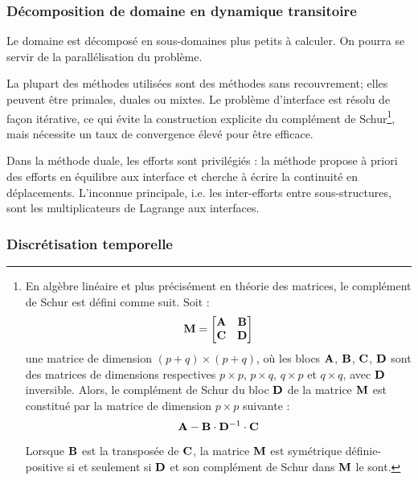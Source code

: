 \medskip
\subsubsection{Décomposition de domaine en dynamique transitoire}\label{Sec-Schur}

Le domaine est décomposé en sous-domaines plus petits à calculer.
On pourra se servir de la parallélisation du problème.

La plupart des méthodes utilisées sont des méthodes sans recouvrement; elles
peuvent être primales, duales ou mixtes. Le problème d'interface est résolu
de façon itérative, ce qui évite la construction explicite du complément
de Schur\footnote{%
En algèbre linéaire et plus précisément en théorie des matrices, le complément de
Schur est défini comme suit. Soit :
\begin{equation} \MM{M}=\MM*{\MM{A} & \MM{B} \\ \MM{C} & \MM{D}} \end{equation}
une matrice de dimension $(p+q)\times(p+q)$, où les blocs $\MM{A}$, $\MM{B}$, $\MM{C}$, $\MM{D}$ sont des matrices
de dimensions respectives $p\times p$, $p\times q$, $q\times p$ et $q\times q$, avec $\MM{D}$ inversible.
Alors, le complément de Schur du bloc $\MM{D}$ de la matrice $\MM{M}$ est constitué par la matrice
de dimension $p\times p$ suivante :
\begin{equation} \MM{A} - \MM{B}\cdot \MMI{D}\cdot \MM{C}\end{equation}

Lorsque $\MM{B}$ est la transposée de $\MM{C}$, la matrice $\MM{M}$ est symétrique définie-positive
si et seulement si $\MM{D}$ et son complément de Schur dans $\MM{M}$ le sont.
}, mais nécessite un taux de convergence élevé pour être
efficace.

Dans la méthode duale, les efforts sont privilégiés : la méthode propose
à priori des efforts en équilibre aux interface et cherche à écrire la continuité
en déplacements. L'inconnue principale, i.e. les inter-efforts entre sous-structures,
sont les multiplicateurs de Lagrange aux interfaces.

\medskip
\subsubsection{Discrétisation temporelle}

